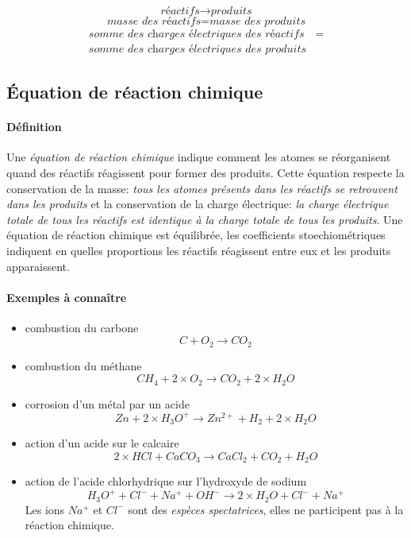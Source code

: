 $$\textit{réactifs}  \xrightarrow{} \textit{produits} $$
$$\textit{masse des réactifs}  = \textit{masse des produits} $$
\begin{equation*}
  \begin{aligned}    
    \textit{somme des charges électriques des réactifs} &= \\
    \textit{somme des charges électriques des produits} &    
 \end{aligned} 
\end{equation*}

\subsection{Équation de réaction chimique}
\paragraph{Définition}
Une \textit{équation de réaction chimique} indique comment les atomes se réorganisent quand des réactifs réagissent pour former des produits. Cette 
équation respecte la conservation de la masse: \textit{tous les atomes présents dans les réactifs se retrouvent dans les produits} et la conservation 
de la charge électrique: \textit{la charge électrique totale de tous les réactifs est identique à la charge totale de tous les produits}.
Une équation de réaction chimique est équilibrée, les coefficients stoechiométriques indiquent en quelles proportions les réactifs réagissent entre eux
et les produits apparaissent.
\paragraph{Exemples à connaître}
\begin{itemize}
 \item combustion du carbone $$ C + O_2 \xrightarrow{} CO_2$$
 \item combustion du méthane $$ CH_4 + 2 \times  O_2 \xrightarrow{} CO_2 + 2 \times H_2O $$
 \item corrosion d'un métal par un acide $$ Zn + 2 \times H_3O^+ \xrightarrow{} Zn^{2+} + H_2 + 2 \times H_2O $$
 \item action d'un acide sur le calcaire $$ 2 \times HCl + CaCO_3  \xrightarrow{} CaCl_2 + CO_2 + H_2O $$
 \item action de l'acide chlorhydrique sur l'hydroxyde de sodium $$ H_3O^+ + Cl^- + Na^+ + OH^-  \xrightarrow{} 2 \times H_2O + Cl^- + Na^+ $$
 Les ions  $Na^+$ et $Cl^-$ sont des \textit{espèces spectatrices}, elles ne participent pas à la réaction chimique.
\end{itemize}


